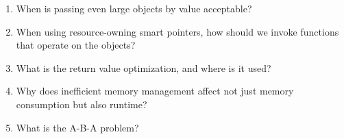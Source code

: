 \begin{enumerate}
\item 
When is passing even large objects by value acceptable?

\item 
When using resource-owning smart pointers, how should we invoke functions that operate on the objects?

\item 
What is the return value optimization, and where is it used?

\item
Why does inefficient memory management affect not just memory consumption but also runtime? 


\item 
What is the A-B-A problem?

\end{enumerate}